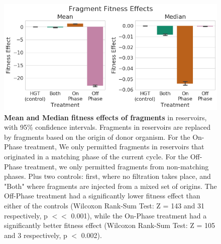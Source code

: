 \documentclass[PhD]{msu-thesis}
\begin{document}
	\begin{figure}[h!]
	\begin{center}
	\includegraphics[width=0.95\columnwidth]{figures/HGT/fitness_effect_by_cycle_phase_source.png}
	\caption{\textbf{Mean and Median fitness effects of fragments} in reservoirs, with 95\% confidence intervals. Fragments in reservoirs are replaced by fragments based on the origin of donor organism. For the On-Phase treatment, We only permitted fragments in reservoirs that originated in a matching phase of the current cycle. For the Off-Phase treatment, we only permitted fragments from non-matching phases. Plus two controls: first, where no filtration takes place, and "Both" where fragments are injected from a mixed set of origins. The Off-Phase treatment had a significantly lower fitness effect than either of the controls (Wilcoxon Rank-Sum Test: Z = 143 and 31 respectively, p $<<$ 0.001), while the On-Phase treatment had a significantly better fitness effect (Wilcoxon Rank-Sum Test: Z = 105 and 3 respectively, p $<$ 0.002). 
	}\label{fig:fitness_effect_by_cycle_phase_source}
	\end{center}
	\end{figure}
\end{document}
